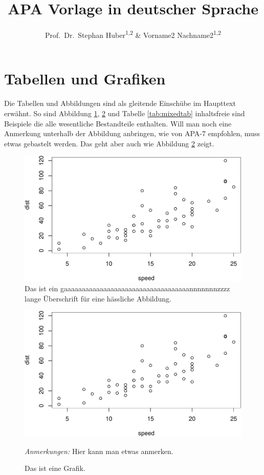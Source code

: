 \documentclass[
  doc,floatsintext]{apa7}
\title{APA Vorlage in deutscher Sprache}
\author{Prof.~Dr.~Stephan Huber\textsuperscript{1,2} \& Vorname2 Nachname2\textsuperscript{1,2}}
\date{}
\affiliation{\vspace{0.5cm}\textsuperscript{1} Fresenius University of Applied Science\\\textsuperscript{2} Charlotte Fresenius University}
\begin{document}
\maketitle

{
\setcounter{tocdepth}{3}
\tableofcontents
}
\clearpage

\hypertarget{tabellen-und-grafiken}{%
\section{Tabellen und Grafiken}\label{tabellen-und-grafiken}}

Die Tabellen und Abbildungen sind als gleitende Einschübe im Haupttext erwähnt. So sind Abbildung \ref{fig:plotcar}, \ref{fig:pressure} und Tabelle \ref{tab:mixedtab} inhaltsfreie sind Beispiele die alle wesentliche Bestandteile enthalten. Will man noch eine Anmerkung unterhalb der Abbildung anbringen, wie von APA-7 empfohlen, muss etwas gebastelt werden. Das geht aber auch wie Abbildung \ref{fig:pressure} zeigt.

\begin{figure}
\includegraphics[width=.5\textwidth]{apa7vorlage_files/figure-latex/plotcar-1} \caption{Das ist ein gaaaaaaaaaaaaaaaaaaaaaaaaaaaaaaaaaaannnnnnnzzzz lange Überschrift für eine hässliche Abbildung.}\label{fig:plotcar}
\end{figure}

\begin{figure}[t]

\includegraphics{apa7vorlage_files/figure-latex/pressure-1.pdf}

\caption{Das ist eine Grafik. \label{fig:pressure}}
\textit{Anmerkungen:} Hier kann man etwas anmerken.
\end{figure}
\end{document}
